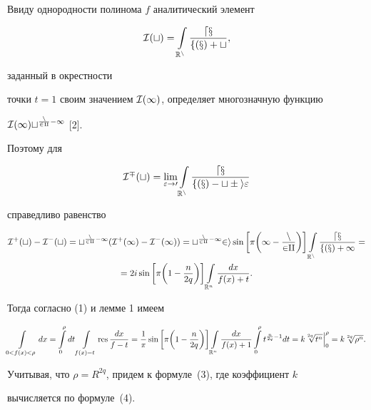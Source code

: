 \begin{pf}


Ввиду однородности полинома $f$ аналитический элемент


$$


\I (t)=\int\limits_{{\Bbb R}^n}\frac{dx}{f(x)+t},


$$


заданный в окрестности


точки $t=1$ своим значением $\cal I (1)$, определяет многозначную функцию


$\cal I (1) t^{\frac{n}{2q}-1}$ [2].


Поэтому для


$$


\I^\mp (t)=\lim\limits_{\varepsilon\to 0}\int\limits_{{\Bbb R}^n}


\frac{dx}{f(x)-t\pm i\varepsilon}


$$


справедливо равенство


\begin{multline*}


\I^+(t)-\I^-(t)=t^{\frac{n}{2q}-1}


(\I^+(1)-\I^-(1))=


t^{\frac{n}{2q}-1}2i\sin\bigg[\pi \bigg


(1-\frac{n}{2q}\bigg )\bigg]\int\limits_{{\Bbb R}^n}


\frac{dx}{f(x)+1}=\\


%


=2i\sin\bigg[\pi\bigg(1-\frac{n}{2q}\bigg)\bigg]\int\limits_{{\Bbb R}^n}


\frac{dx}{f(x)+t}.


\end{multline*}


Тогда согласно (1) и лемме 1 имеем


$$


\int\limits_{0<f(x)<\rho}dx=


\int\limits_0^{\rho}{dt}\int\limits_{f(x)=t}


{\res \frac{dx}{f-t}}=


\frac{1}{\pi}\sin\bigg[\pi\bigg(1-\frac{n}{2q}\bigg)\bigg]


\int\limits_{{\Bbb R}^n}{\frac{dx}{f(x)+1}}\int\limits_0^\rho


{t^{\frac{n}{2q}-1}dt}= k\sqrt[\uproot{2}2q]{t^n}\Big|_0^\rho=


k\sqrt[\uproot{2}2q]{\rho^n}.


$$


Учитывая, что $\rho=R^{2q}$, придем к формуле~(3), где коэффициент $k$


вычисляется по формуле~(4).


\end{pf}





